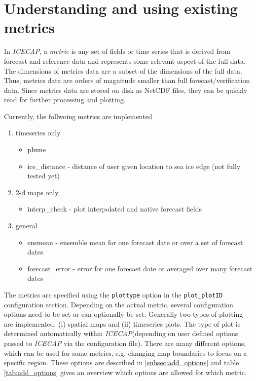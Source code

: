 \documentclass[DIV=10, parskip=full]{scrreprt}
\newcommand{\ice}{\textit{ICECAP}\xspace}
\newcommand{\notimplement}[1]{#1}
\begin{document}
\section{Understanding and using existing metrics}
In \ice, a \emph{metric} is any set of fields or time series that is derived from forecast and reference data and represents some relevant aspect of the full data. The dimensions of metrics data are a subset of the dimensions of the full data. Thus, metrics data are orders of magnitude smaller than full forecast/verification data. Since metrics data are stored on disk as NetCDF files, they can be quickly read for further processing and plotting. 

Currently, the follwoing metrics are \notimplement{implemented}
\begin{enumerate}
	\item timeseries only
	\begin{itemize}
		\item plume
		\item ice\_distance - distance of user given location to sea ice edge (not fully tested yet)
	\end{itemize}
	\item 2-d maps only
	\begin{itemize}
		\item interp\_check - plot interpolated and native forecast fields
	\end{itemize}
	\item general
		\begin{itemize}
		\item ensmean - ensemble mean for one forecast date or over a set of forecast dates 
		\item forecast\_error - error for one forecast date or averaged over many forecast dates
	\end{itemize}
\end{enumerate}

The metrics are specified using the \texttt{plottype} option in the \texttt{plot\_plotID} configuration section. Depending on the actual metric, several configuration options need to be set or can optionally be set. Generally two types of plotting are implemented: (i) spatial maps and (ii) timeseries plots. The type of plot is determined automatically within \ice (depending on user defined options passed to \ice via the configuration file). There are many different options, which can be used for some metrics, e.g. changing map boundaries to focus on a specific region. These options are described in \ref{subsec:add_options} and table \ref{tab:add_options} gives an overview which options are allowed for which metric.
\end{document}
